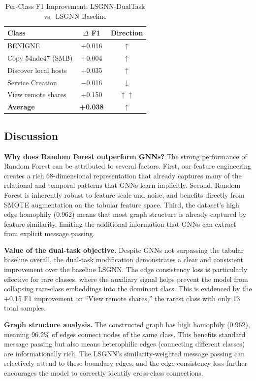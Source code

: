 \documentclass[conference]{IEEEtran}
\begin{document}
\begin{table}[t]
\centering
\caption{Per-Class F1 Improvement: LSGNN-DualTask vs.\ LSGNN Baseline}
\label{tab:improvement}
\begin{tabular}{@{}lcc@{}}
\toprule
\textbf{Class} & \textbf{$\Delta$ F1} & \textbf{Direction} \\
\midrule
BENIGNE              & +0.016 & $\uparrow$ \\
Copy 54ndc47 (SMB)   & +0.004 & $\uparrow$ \\
Discover local hosts & +0.035 & $\uparrow$ \\
Service Creation     & $-$0.016 & $\downarrow$ \\
View remote shares   & +0.150 & $\uparrow\uparrow$ \\
\midrule
\textbf{Average}     & \textbf{+0.038} & $\uparrow$ \\
\bottomrule
\end{tabular}
\end{table}

\subsection{Discussion}

\textbf{Why does Random Forest outperform GNNs?} The strong performance of Random Forest can be attributed to several factors. First, our feature engineering creates a rich 68-dimensional representation that already captures many of the relational and temporal patterns that GNNs learn implicitly. Second, Random Forest is inherently robust to feature scale and noise, and benefits directly from SMOTE augmentation on the tabular feature space. Third, the dataset's high edge homophily (0.962) means that most graph structure is already captured by feature similarity, limiting the additional information that GNNs can extract from explicit message passing.

\textbf{Value of the dual-task objective.} Despite GNNs not surpassing the tabular baseline overall, the dual-task modification demonstrates a clear and consistent improvement over the baseline LSGNN. The edge consistency loss is particularly effective for rare classes, where the auxiliary signal helps prevent the model from collapsing rare-class embeddings into the dominant class. This is evidenced by the +0.15 F1 improvement on ``View remote shares,'' the rarest class with only 13 total samples.

\textbf{Graph structure analysis.} The constructed graph has high homophily (0.962), meaning 96.2\% of edges connect nodes of the same class. This benefits standard message passing but also means heterophilic edges (connecting different classes) are informationally rich. The LSGNN's similarity-weighted message passing can selectively attend to these boundary edges, and the edge consistency loss further encourages the model to correctly identify cross-class connections.
\end{document}

